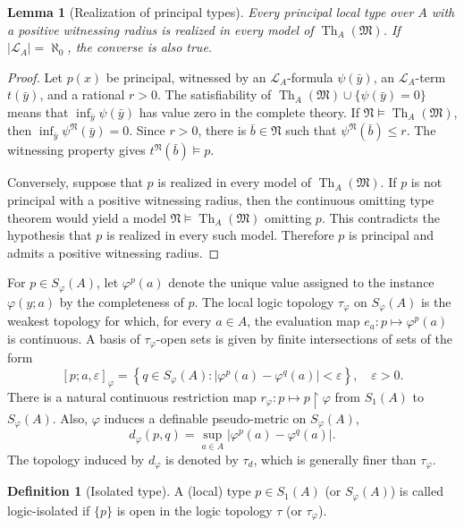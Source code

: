 \documentclass{amsart}
\newtheorem{lemma}[theorem]{Lemma}
\theoremstyle{definition}
\newtheorem{definition}{Definition}[section]
\theoremstyle{remark}
\numberwithin{equation}{section}
\begin{document}
\begin{lemma}[Realization of principal types]
	\label{lem:realization-principal-types}
	Every principal local type over $A$ with a positive witnessing
	radius is realized in every model of
	$\operatorname{Th}_{A}(\mathfrak M)$. If $|\mathcal L_A| = \aleph_0$, the converse is also true.
\end{lemma}

\begin{proof}
	Let $p(x)$ be principal, witnessed by an
	$\mathcal L_{A}$-formula $\psi(\bar y)$, an
	$\mathcal L_{A}$-term $t(\bar y)$, and a rational $r>0$. The
	satisfiability of
	$\operatorname{Th}_{A}(\mathfrak M)\cup\{\psi(\bar y)=0\}$
	means that $\inf_{\bar y}\psi(\bar y)$ has value zero in the complete
	theory. If
	$\mathfrak N\models\operatorname{Th}_{A}(\mathfrak M)$, then
	$\inf_{\bar y}\psi^{\mathfrak N}(\bar y)=0$. Since $r>0$, there is
	$\bar b\in\mathfrak N$ such that $\psi^{\mathfrak N}(\bar b)\le r$.
	The witnessing property gives $t^{\mathfrak N}(\bar b)\models p$.
	
	Conversely, suppose that $p$ is realized in every model of
	$\operatorname{Th}_{A}(\mathfrak M)$. If $p$ is not principal with
	a positive witnessing radius, then the continuous omitting type
	theorem \cite[Theorem 4.9]{Eagle2014omiting} would yield a model
	$\mathfrak N\models\operatorname{Th}_{A}(\mathfrak M)$ omitting
	$p$. This contradicts the hypothesis that $p$ is realized in every
	such model. Therefore $p$ is principal and admits a positive
	witnessing radius.
\end{proof}

For $p\in S_\varphi(A)$, let
$\varphi^p(a)$ denote the unique value assigned to the instance $\varphi(y;a)$ by the completeness of $p$. The local logic topology $\tau_\varphi$ on $S_\varphi(A)$ is the
weakest topology for which, for every $a\in A$, the evaluation map
$e_a:p\mapsto\varphi^p(a)$
is continuous. A basis of $\tau_\varphi$-open sets is given by finite
intersections of sets of the form
$$
[p;a,\varepsilon]_\varphi = \left\{
q\in S_\varphi(A):
\left|\varphi^p(a) - \varphi^q(a)\right|<\varepsilon
\right\}, \quad\varepsilon>0.
$$
There is a natural continuous restriction map $r_\varphi:p\mapsto p\upharpoonright\varphi$ from $S_1(A)$ to $S_\varphi(A)$.
Also, $\varphi$ induces a definable pseudo-metric on $S_\varphi(A)$,
$$d_{\varphi}(p,q)=\sup_{a\in A}\left|\varphi^p(a)-\varphi^q(a)\right|.$$
The topology induced by $d_{\varphi}$ is denoted by
$\tau_d$, which is generally finer than $\tau_\varphi$.
\begin{definition}[Isolated type]
	A (local) type $p \in S_1(A)$ (or $S_\varphi(A)$) is called logic-isolated if $\{p\}$ is open in the logic topology $\tau$ (or $\tau_\varphi$).
\end{definition}
\end{document}
